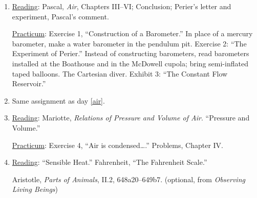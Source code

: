 \documentclass{article}
\newcommand{\rd}{\uline{Reading}}
\newcommand{\pc}{\uline{Practicum}}
\begin{document}
\begin{enumerate}
\begin{minipage}{0.9\textwidth}
	\pc:\footnote{Roman numerals after (\ref{syringe})--(\ref{syphon}) above refer to locations of the experiment in the \emph{Treatise} by
	chapter and section. There are also \href{https://sjca.sharepoint.com/:b:/r/sites/Departments/Faculty/Documents/Annapolis/Freshman\%20Lab/Schedule\%20and\%20files/Siphons_supplement.pdf?csf=1&web=1&e=tmonbh}{\textcolor{Maroon}{optional demos}}.}
	\begin{enumerate}[nosep]
		\item Weigh a balloon with and without air. (Chapter I, paragraph 1)
		\item Seal a syringe and try to open it. (II.I)\label{syringe}
		\item Try to pry apart two glass surfaces or suspend them in air. (II.II)
		\item Straws. (II.III)
		\item Rarify vessel of air with candle to make water rise up in inverted glass. (II.III)
		\item Invert a glass of water in a tub of water. (II.IV)
		\item Make a siphon. (II.V)\label{syphon}
	\end{enumerate}
	\end{minipage}
\item \rd:\label{air}  Pascal, \emph{Air}, Chapters III--VI; Conclusion; Perier’s letter
and experiment, Pascal’s comment.
  
\pc: Exercise 1, ``Construction of a Barometer.'' In place of a mercury barometer, make a water barometer in the pendulum pit.
Exercise 2: ``The Experiment of Perier.'' Instead of constructing barometers, read barometers installed at the Boathouse and in the McDowell cupola; bring semi-inflated taped balloons.
The Cartesian diver. Exhibit 3: “The Constant Flow Reservoir.” 

\item Same assignment as day \ref{air}.

\item \rd:  Mariotte, \emph{Relations of Pressure and Volume of Air}. ``Pressure and Volume.'' 

	\pc: Exercise 4, ``Air is condensed\dots.'' Problems, Chapter IV.
\item \rd:  ``Sensible Heat.'' Fahrenheit, ``The Fahrenheit
	Scale.''
	
	Aristotle, \emph{Parts of Animals}, II.2, 648a20--649b7. (optional, from \emph{Observing Living Beings}) 


\end{enumerate}
\end{document}
